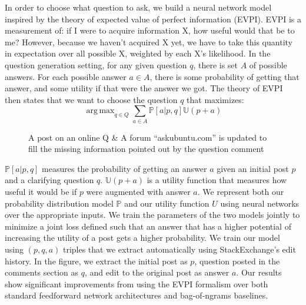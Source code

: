 \documentclass[11pt,a4paper]{article}
\DeclareMathOperator*{\argmax}{arg\,max}
\newcommand{\U}{\mathbb{U}}
\begin{document}
In order to choose what question to ask, we build a neural network model inspired by the theory of expected value of perfect information (EVPI). EVPI is a measurement of: if I were to acquire information X, how useful would that be to me? However, because we haven't acquired X yet, we have to take this quantity in expectation over all possible X, weighted by each X's likelihood. In the question generation setting, for any given question $q$, there is set $A$ of possible answers. For each possible answer $a \in A$, there is some probability of getting that answer, and some utility if that were the answer we got. The theory of EVPI then states that we want to choose the question $q$ that maximizes:
\begin{equation}\label{evpi_equation}
\argmax_{q \in Q} \sum_{a \in A} \mathbb{P}[a | p,q] \U(p+a)
\end{equation} 
\begin{figure}[!t]
	\centering
	\setlength\fboxsep{1pt}
	\setlength\fboxrule{0.5pt}
	\caption{A post on an online Q \& A forum ``askubuntu.com'' is updated to fill the missing information pointed out by the question comment}
	\label{askubuntu_post}
\end{figure}


$\mathbb{P}[a | p,q]$ measures the probability of getting an answer $a$ given an initial post $p$ and a clarifying question $q$. $\U(p+a)$ is a utility function that measures how useful it would be if $p$ were augmented with answer $a$. We represent both our probability distribution model $\mathbb{P}$ and our utility function $U$ using neural networks over the appropriate inputs.  We train the parameters of the two models jointly to minimize a joint loss defined such that an answer that has a higher potential of increasing the utility of a post gets a higher probability. We train our model using $(p,q,a)$ triples that we extract automatically using StackExchange's edit history. In the figure, we extract the initial post as $p$, question posted in the comments section as $q$, and edit to the original post as answer $a$. Our results show significant improvements from using the EVPI formalism over both standard feedforward network architectures and bag-of-ngrams baselines.



\end{document}
